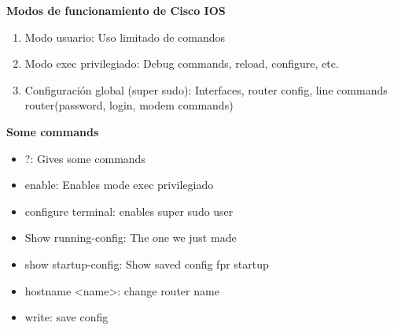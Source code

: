 \documentclass{article}
\begin{document}
\vspace{1cm}

\textbf{Modos de funcionamiento de Cisco IOS}

\begin{enumerate}
    \item Modo usuario: Uso limitado de comandos
    \item Modo exec privilegiado: Debug commands, reload, configure, etc.
    \item Configuración global (super sudo): Interfaces, router config, line commands
          router(password, login, modem commands)
\end{enumerate}

\vspace{1cm}

\textbf{Some commands}
\begin{itemize}
    \item \(\)?: Gives some commands
    \item enable: Enables mode exec privilegiado
    \item configure terminal: enables super sudo user
    \item Show running-config: The one we just made
    \item show startup-config: Show saved config fpr startup
    \item hostname <name>: change router name
    \item write: save config
\end{itemize}
\end{document}
